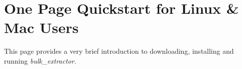 \documentclass[11pt]{article} %
\begin{document}
\newcommand \bulk {\textit{bulk\_extractor}\xspace}
\newcommand \beapi {\textit{be13\_api}\xspace}
\newcommand \viewer {\textbf{Bulk Extractor Viewer}\xspace}





\setlength{\parindent}{0pt} %
\newpage
\thispagestyle{empty}
\mbox{}
\newpage
\section*{One Page Quickstart for Linux \& Mac Users}
This page provides a very brief introduction to downloading, installing and running \bulk. 
\end{document}
